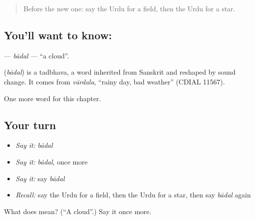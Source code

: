 \label{lesson:UR-C65-badal}



\begin{quote}
Before the new one: say the Urdu for a field, then the Urdu for a star.
\end{quote}

\subsection*{You'll want to know: }
\textbf{} — \emph{bādal} — \textquotedblleft{}a cloud\textquotedblright{}.

\begin{cousinweb}
\textbf{} (\emph{bādal}) is a tadbhava, a word inherited from Sanskrit and reshaped by sound change. It comes from \emph{vārdala}, \textquotedblleft{}rainy day, bad weather\textquotedblright{} (CDIAL 11567).
\end{cousinweb}

\begin{grammarlens}[title={What you've built}]
One more word for this chapter.
\end{grammarlens}

\subsection*{Your turn}
\begin{itemize}
\raggedright
  \item \emph{Say it:} \emph{bādal}
  \item \emph{Say it:} \emph{bādal}, once more
  \item \emph{Say it:} say \emph{bādal}
  \item \emph{Recall:} say the Urdu for a field, then the Urdu for a star, then say \emph{bādal} again
\end{itemize}

\begin{tcolorbox}[breakable,colback=teal!4,colframe=teal!35!black,title={Before you move on}]
What does  mean? (\textquotedblleft{}A cloud\textquotedblright{}.) Say it once more.
\end{tcolorbox}
